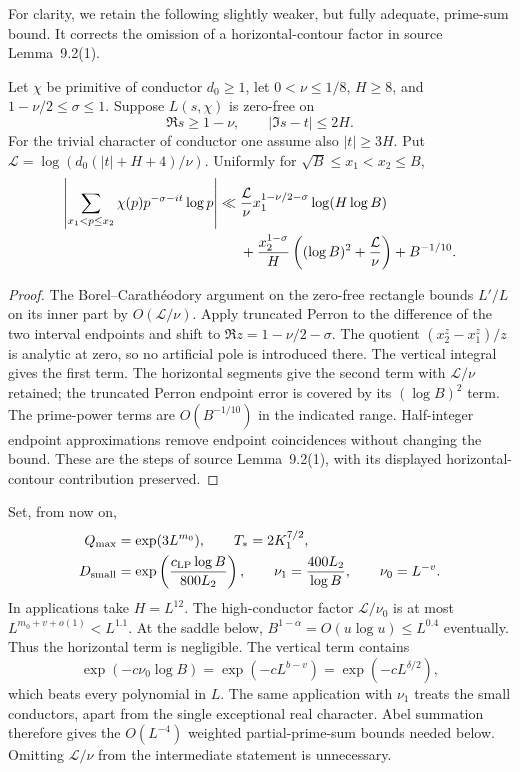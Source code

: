For clarity, we retain the following slightly weaker, but fully adequate,
prime-sum bound.  It corrects the omission of a horizontal-contour factor
in source Lemma~9.2(1).

\begin{lemma}\label{lem:prime-sum}
Let \(\chi\) be primitive of conductor \(d_0\ge1\), let
\(0<\nu\le1/8\), \(H\ge8\), and
\(1-\nu/2\le\sigma\le1\).  Suppose \(L(s,\chi)\) is zero-free on
\[
 \Re s\ge1-\nu,\qquad |\Im s-t|\le2H.
\]
For the trivial character of conductor one assume also \(|t|\ge3H\).
Put \(\mathcal L=\log(d_0(|t|+H+4)/\nu)\).  Uniformly for
\(\sqrt B\le x_1<x_2\le B\),
\begin{align}\label{eq:prime-sum}
 \left|\sum_{x_1<p\le x_2}\chi(p)p^{-\sigma-it}\log p\right|
 \ll{}&\frac{\mathcal L}{\nu}
     x_1^{1-\nu/2-\sigma}\log(H\log B)\notag\\
 &+\frac{x_2^{1-\sigma}}{H}
       \left((\log B)^2+\frac{\mathcal L}{\nu}\right)
       +B^{-1/10}.
\end{align}
\end{lemma}

\begin{proof}
The Borel--Carath\'eodory argument on the zero-free rectangle bounds
\(L'/L\) on its inner part by \(O(\mathcal L/\nu)\).  Apply truncated
Perron to the difference of the two interval endpoints and shift to
\(\Re z=1-\nu/2-\sigma\).  The quotient
\((x_2^z-x_1^z)/z\) is analytic at zero, so no artificial pole is
introduced there.  The vertical integral gives the first term.
The horizontal segments give the second term with
\(\mathcal L/\nu\) retained; the truncated Perron endpoint error is
covered by its \((\log B)^2\) term.  The prime-power terms are
\(O(B^{-1/10})\) in the indicated range.  Half-integer endpoint
approximations remove endpoint coincidences without changing the bound.
These are the steps of source Lemma~9.2(1), with its displayed
horizontal-contour contribution preserved.
\end{proof}

Set, from now on,
\begin{equation}\label{eq:conductor-parameters}
 \begin{split}
 Q_{\max}&=\exp(3L^{m_0}),\qquad T_*=2K_1^{7/2},\\
 D_{\rm small}&=\exp\left(\frac{c_{\rm LP}\log B}{800L_2}\right),
 \qquad \nu_1=\frac{400L_2}{\log B},\qquad \nu_0=L^{-v}.
 \end{split}
\end{equation}
In applications take \(H=L^{12}\).  The high-conductor factor
\(\mathcal L/\nu_0\) is at most
\(L^{m_0+v+o(1)}<L^{1.1}\).  At the saddle below,
\(B^{1-\alpha}=O(u\log u)\le L^{0.4}\) eventually.  Thus the
horizontal term is negligible.  The vertical term contains
\[
 \exp(-c\nu_0\log B)
   =\exp(-cL^{b-v})=\exp(-cL^{\delta/2}),
\]
which beats every polynomial in \(L\).
The same application with \(\nu_1\) treats the small conductors,
apart from the single exceptional real character.  Abel summation
therefore gives the \(O(L^{-4})\) weighted partial-prime-sum bounds
needed below.  Omitting \(\mathcal L/\nu\) from the intermediate
statement is unnecessary.

